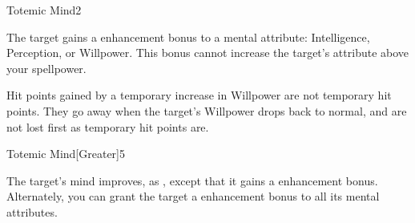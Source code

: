 \begin{spellsection}{Totemic Mind}{2}
    \begin{spellheader}
    \end{spellheader}
    \begin{spellcontent}
        \begin{spelltargetinginfo}
        \end{spelltargetinginfo}
        \begin{spelleffects}
            \spelleffect The target gains a  enhancement bonus to a mental attribute: Intelligence, Perception, or Willpower. This bonus cannot increase the target's attribute above your spellpower.
            \spelldur \durpersonallong
        \end{spelleffects}
    \end{spellcontent}
    \begin{spellfooter}
        \spellnotes Hit points gained by a temporary increase in Willpower are not temporary hit points. They go away when the target's Willpower drops back to normal, and are not lost first as temporary hit points are.
    \end{spellfooter}
\end{spellsection}

\begin{spellsection}{Totemic Mind}[Greater]{5}
    \begin{spellheader}
    \end{spellheader}
    \begin{spellcontent}
        \begin{spelltargetinginfo}
        \end{spelltargetinginfo}
        \begin{spelleffects}
            \spelleffect The target's mind improves, as , except that it gains a  enhancement bonus. Alternately, you can grant the target a  enhancement bonus to all its mental attributes.
            \spelldur \durpersonallong
        \end{spelleffects}
    \end{spellcontent}
    \begin{spellfooter}
    \end{spellfooter}
\end{spellsection}

